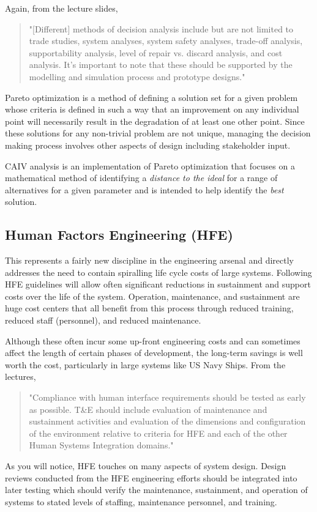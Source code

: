 \documentclass[letterpaper,12pt]{article}
\begin{document}
Again, from the lecture slides,
\begin{quote}
"[Different] methods of decision analysis include but are not limited to trade studies, system analyses, system safety analyses, trade-off analysis, supportability analysis, level of repair vs. discard analysis, and cost analysis.  It's important to note that these should be supported by the modelling and simulation process and prototype designs."
\end{quote}

Pareto optimization is a method of defining a solution set for a given problem whose criteria is defined in such a way that an improvement on any individual point will necessarily result in the degradation of at least one other point.  Since these solutions for any non-trivial problem are not unique, managing the decision making process involves other aspects of design including stakeholder input.

CAIV analysis is an implementation of Pareto optimization that focuses on a mathematical method of identifying a \emph{distance to the ideal} for a range of alternatives for a given parameter and is intended to help identify the \emph{best} solution.

\subsection{Human Factors Engineering (HFE)}
This represents a fairly new discipline in the engineering arsenal and directly addresses the need to contain spiralling life cycle costs of large systems.  Following HFE guidelines will allow often significant reductions in sustainment and support costs over the life of the system.  Operation, maintenance, and sustainment are huge cost centers that all benefit from this process through reduced training, reduced staff (personnel), and reduced maintenance.

Although these often incur some up-front engineering costs and can sometimes affect the length of certain phases of development, the long-term savings is well worth the cost, particularly in large systems like US Navy Ships.  From the lectures,
\begin{quote}
"Compliance with human interface requirements should be tested as early as possible. T\&E should include evaluation of maintenance and sustainment activities and evaluation of the dimensions and configuration of the environment relative to criteria for HFE and each of the other Human Systems Integration domains."
\end{quote}
As you will notice, HFE touches on many aspects of system design.  Design reviews conducted from the HFE engineering efforts should be integrated into later testing which should verify the maintenance, sustainment, and operation of systems to stated levels of staffing, maintenance personnel, and training.
\end{document}
